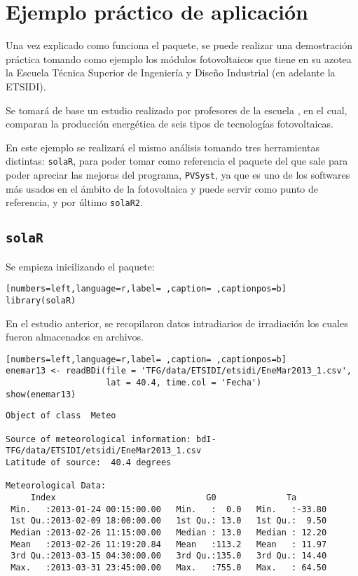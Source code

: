 \chapter{Ejemplo práctico de aplicación}
\label{chap:ejemplo-practico-aplicacion}
Una vez explicado como funciona el paquete, se puede realizar una demostración práctica tomando como ejemplo los módulos fotovoltaicos que tiene en su azotea la Escuela Técnica Superior de Ingeniería y Diseño Industrial (en adelante la ETSIDI).

Se tomará de base un estudio realizado por profesores de la escuela \cite{adrada17}, en el cual, comparan la producción energética de seis tipos de tecnologías fotovoltaicas.

En este ejemplo se realizará el mismo análisis tomando tres herramientas distintas: \texttt{solaR}, para poder tomar como referencia el paquete del que sale para poder apreciar las mejoras del programa, \texttt{PVSyst}, ya que es uno de los softwares más usados en el ámbito de la fotovoltaica y puede servir como punto de referencia, y por último \texttt{solaR2}.

\section{\texttt{solaR}}
\label{sec:org0300040}
\label{sec:solaR}
Se empieza inicilizando el paquete:
\begin{lstlisting}[numbers=left,language=r,label= ,caption= ,captionpos=b]
library(solaR)
\end{lstlisting}

En el estudio anterior, se recopilaron datos intradiarios de irradiación los cuales fueron almacenados en archivos.
\begin{lstlisting}[numbers=left,language=r,label= ,caption= ,captionpos=b]
enemar13 <- readBDi(file = 'TFG/data/ETSIDI/etsidi/EneMar2013_1.csv',
                    lat = 40.4, time.col = 'Fecha')
show(enemar13)
\end{lstlisting}

\begin{verbatim}
Object of class  Meteo 

Source of meteorological information: bdI-TFG/data/ETSIDI/etsidi/EneMar2013_1.csv 
Latitude of source:  40.4 degrees

Meteorological Data:
     Index                              G0              Ta        
 Min.   :2013-01-24 00:15:00.00   Min.   :  0.0   Min.   :-33.80  
 1st Qu.:2013-02-09 18:00:00.00   1st Qu.: 13.0   1st Qu.:  9.50  
 Median :2013-02-26 11:15:00.00   Median : 13.0   Median : 12.20  
 Mean   :2013-02-26 11:19:20.84   Mean   :113.2   Mean   : 11.97  
 3rd Qu.:2013-03-15 04:30:00.00   3rd Qu.:135.0   3rd Qu.: 14.40  
 Max.   :2013-03-31 23:45:00.00   Max.   :755.0   Max.   : 64.50
\end{verbatim}

